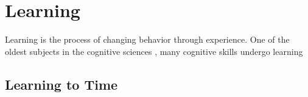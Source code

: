 \chapter{Learning}
    Learning is the process of changing behavior through experience. One of the oldest subjects in the cognitive sciences \cite{}, many cognitive skills undergo learning
    


\section{Learning to Time}

    
